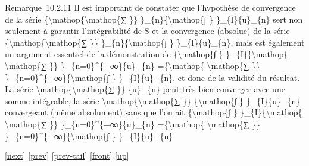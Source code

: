 \documentclass[]{article}
\begin{document}
Remarque~10.2.11 Il est important de constater que l'hypothèse de
convergence de la série
\{\textbackslash{}mathop\{\textbackslash{}mathop\{∑ \}\}
\}\_\{n\}\{\textbackslash{}mathop\{∫ \}
\}\_\{I\}\textbar{}\{u\}\_\{n\}\textbar{} sert non seulement à garantir
l'intégrabilité de S et la convergence (absolue) de la série
\{\textbackslash{}mathop\{\textbackslash{}mathop\{∑ \}\}
\}\_\{n\}\{\textbackslash{}mathop\{∫ \} \}\_\{I\}\{u\}\_\{n\}, mais est
également un argument essentiel de la démonstration de
\{\textbackslash{}mathop\{∫ \} \}\_\{I\}\{\textbackslash{}mathop\{
\textbackslash{}mathop\{∑ \}\} \}\_\{n=0\}\^{}\{+∞\}\{u\}\_\{n\}
=\{\textbackslash{}mathop\{ \textbackslash{}mathop\{∑ \}\}
\}\_\{n=0\}\^{}\{+∞\}\{\textbackslash{}mathop\{∫ \}
\}\_\{I\}\{u\}\_\{n\}, et donc de la validité du résultat. La série
\textbackslash{}mathop\{\textbackslash{}mathop\{∑ \}\} \{u\}\_\{n\} peut
très bien converger avec une somme intégrable, la série
\textbackslash{}mathop\{\textbackslash{}mathop\{∑ \}\}
\{\textbackslash{}mathop\{∫ \} \}\_\{I\}\{u\}\_\{n\} convergeant (même
absolument) sans que l'on ait \{\textbackslash{}mathop\{∫ \}
\}\_\{I\}\{\textbackslash{}mathop\{ \textbackslash{}mathop\{∑ \}\}
\}\_\{n=0\}\^{}\{+∞\}\{u\}\_\{n\} =\{\textbackslash{}mathop\{
\textbackslash{}mathop\{∑ \}\}
\}\_\{n=0\}\^{}\{+∞\}\{\textbackslash{}mathop\{∫ \}
\}\_\{I\}\{u\}\_\{n\}

{[}\href{coursse62.html}{next}{]} {[}\href{coursse60.html}{prev}{]}
{[}\href{coursse60.html\#tailcoursse60.html}{prev-tail}{]}
{[}\href{coursse61.html}{front}{]}
{[}\href{coursch11.html\#coursse61.html}{up}{]}
\end{document}

